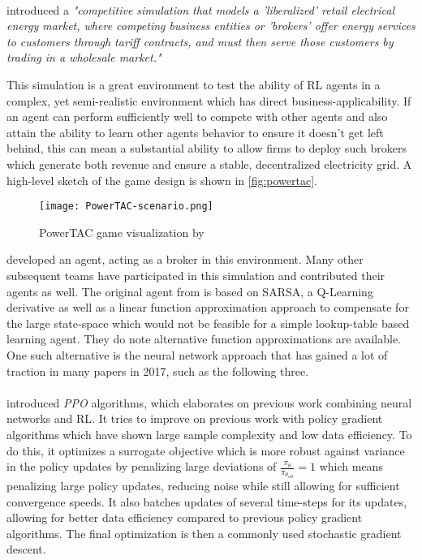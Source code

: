 \documentclass[12pt,a4paper]{article}
\begin{document}
\paragraph{\citeauthor{ketter2016powertac}} introduced a \emph{"competitive simulation that models a 'liberalized'
retail electrical energy market, where competing business entities or 'brokers' offer energy services to customers
through tariff contracts, and must then serve those customers by trading in a wholesale market."}

This simulation is a great environment to test the ability of \ac{RL} agents in a complex, yet semi-realistic
environment which has direct business-applicability. If an agent can perform sufficiently well to compete with other
agents and also attain the ability to learn other agents behavior to ensure it doesn't get left behind, this can mean a
substantial ability to allow firms to deploy such brokers which generate both revenue and ensure a stable, decentralized
electricity grid. A high-level sketch of the game design is shown in \autoref{fig:powertac}.

\begin{figure}[] \centering \texttt{[image: PowerTAC-scenario.png]} \caption{PowerTAC game
visualization by \cite{ketter2016powertac}} \label{fig:powertac} \end{figure}

\citeauthor{peters2013reinforcement} developed an agent, acting as a broker in this environment. Many other subsequent
teams have participated in this simulation and contributed their agents as well. The original agent from
\cite{peters2013reinforcement} is based on SARSA, a Q-Learning derivative as well as a linear function approximation
approach to compensate for the large state-space which would not be feasible for a simple lookup-table based learning
agent. They do note alternative function approximations are available. One such alternative is the neural network
approach that has gained a lot of traction in many papers in 2017, such as the following three.

\paragraph{\citeauthor{proximalpolicyopt}} introduced \emph{\acf{PPO}} algorithms, which elaborates on previous work
combining neural networks and \ac{RL}. It tries to improve on previous work with policy gradient algorithms which have
shown large sample complexity and low data efficiency. To do this, it optimizes a surrogate objective which is more
robust against variance in the policy updates by penalizing large deviations of $\frac{\pi_\theta}{\pi_{\theta_{old}}} =
1$ which means penalizing large policy updates, reducing noise while still allowing for sufficient convergence speeds.
It also batches updates of several time-steps for its updates, allowing for better data efficiency compared to previous
policy gradient algorithms. The final optimization is then a commonly used stochastic gradient descent.
\end{document}
